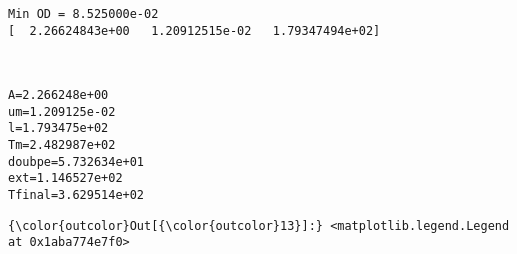 \documentclass[11pt]{article}
\begin{document}
    \begin{Verbatim}[commandchars=\\\{\}]
Min OD = 8.525000e-02
[  2.26624843e+00   1.20912515e-02   1.79347494e+02]

    \end{Verbatim}

    \begin{center}
    \end{center}
    { \hspace*{\fill} \\}
    
    \begin{Verbatim}[commandchars=\\\{\}]
A=2.266248e+00
um=1.209125e-02
l=1.793475e+02
Tm=2.482987e+02
doubpe=5.732634e+01
ext=1.146527e+02
Tfinal=3.629514e+02

    \end{Verbatim}

            \begin{Verbatim}[commandchars=\\\{\}]
{\color{outcolor}Out[{\color{outcolor}13}]:} <matplotlib.legend.Legend at 0x1aba774e7f0>
\end{Verbatim}
        
    \begin{center}
    \end{center}
    { \hspace*{\fill} \\}
    
    \begin{center}
    \end{center}
    { \hspace*{\fill} \\}
    
\end{document}
